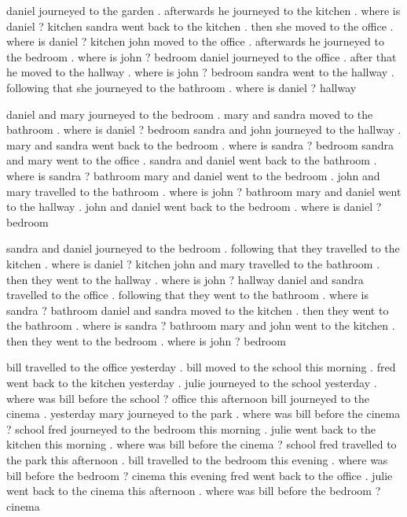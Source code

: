   
\begin{tcbraster}[raster columns=2,  size=minimal, raster valign=top] 
    \begin{tcolorbox}[mybox, title=Task 11:Name, height fill] 
    \tiny
daniel journeyed to the garden . afterwards he journeyed to the kitchen . where is daniel ? kitchen sandra went back to the kitchen . then she moved to the office . where is daniel ? kitchen john moved to the office . afterwards he journeyed to the bedroom . where is john ? bedroom daniel journeyed to the office . after that he moved to the hallway . where is john ? bedroom sandra went to the hallway . following that she journeyed to the bathroom . where is daniel ? hallway
    \end{tcolorbox}  


    \begin{tcolorbox}[mybox, title=Task 12:Name, height fill] 
    \tiny
daniel and mary journeyed to the bedroom . mary and sandra moved to the bathroom . where is daniel ? bedroom sandra and john journeyed to the hallway . mary and sandra went back to the bedroom . where is sandra ? bedroom sandra and mary went to the office . sandra and daniel went back to the bathroom . where is sandra ? bathroom mary and daniel went to the bedroom . john and mary travelled to the bathroom . where is john ? bathroom mary and daniel went to the hallway . john and daniel went back to the bedroom . where is daniel ? bedroom
    \end{tcolorbox}    




    \begin{tcolorbox}[mybox, title=Task 13:Name, height fill] 
    \tiny
sandra and daniel journeyed to the bedroom . following that they travelled to the kitchen . where is daniel ? kitchen john and mary travelled to the bathroom . then they went to the hallway . where is john ? hallway daniel and sandra travelled to the office . following that they went to the bathroom . where is sandra ? bathroom daniel and sandra moved to the kitchen . then they went to the bathroom . where is sandra ? bathroom mary and john went to the kitchen . then they went to the bedroom . where is john ? bedroom
    \end{tcolorbox}  


    \begin{tcolorbox}[mybox, title=Task 14:Name, height fill] 
    \tiny
bill travelled to the office yesterday . bill moved to the school this morning . fred went back to the kitchen yesterday . julie journeyed to the school yesterday . where was bill before the school ? office this afternoon bill journeyed to the cinema . yesterday mary journeyed to the park . where was bill before the cinema ? school fred journeyed to the bedroom this morning . julie went back to the kitchen this morning . where was bill before the cinema ? school fred travelled to the park this afternoon . bill travelled to the bedroom this evening . where was bill before the bedroom ? cinema this evening fred went back to the office . julie went back to the cinema this afternoon . where was bill before the bedroom ? cinema
    \end{tcolorbox}    




\end{tcbraster}
